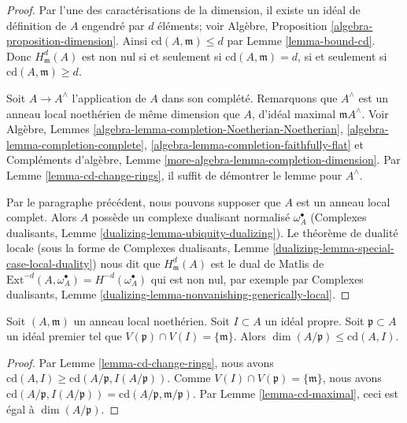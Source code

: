 \begin{proof}
Par l'une des caractérisations de la dimension, il existe
un idéal de définition de $A$ engendré par $d$ éléments; voir
Algèbre, Proposition \ref{algebra-proposition-dimension}.
Ainsi $\text{cd}(A, \mathfrak m) \leq d$ par
Lemme \ref{lemma-bound-cd}. Donc $H^d_\mathfrak m(A)$ est
non nul si et seulement si $\text{cd}(A, \mathfrak m) = d$, si et seulement si
$\text{cd}(A, \mathfrak m) \geq d$.

\medskip\noindent
Soit $A \to A^\wedge$ l'application de $A$ dans son complété.
Remarquons que $A^\wedge$ est un anneau local noethérien de
même dimension que $A$, d'idéal maximal $\mathfrak m A^\wedge$.
Voir Algèbre, Lemmes
\ref{algebra-lemma-completion-Noetherian-Noetherian},
\ref{algebra-lemma-completion-complete},
\ref{algebra-lemma-completion-faithfully-flat} et
Compléments d'algèbre, Lemme \ref{more-algebra-lemma-completion-dimension}.
Par Lemme \ref{lemma-cd-change-rings},
il suffit de démontrer le lemme pour $A^\wedge$.

\medskip\noindent
Par le paragraphe précédent, nous pouvons supposer que $A$ est
un anneau local complet. Alors $A$ possède un complexe dualisant normalisé
$\omega_A^\bullet$ (Complexes dualisants, Lemme
\ref{dualizing-lemma-ubiquity-dualizing}).
Le théorème de dualité locale (sous la forme de
Complexes dualisants, Lemme \ref{dualizing-lemma-special-case-local-duality})
nous dit que $H^d_\mathfrak m(A)$ est le dual de Matlis de
$\text{Ext}^{-d}(A, \omega_A^\bullet) = H^{-d}(\omega_A^\bullet)$
qui est non nul, par exemple par
Complexes dualisants, Lemme
\ref{dualizing-lemma-nonvanishing-generically-local}.
\end{proof}

\begin{lemma}
\label{lemma-cd-bound-dim-local}
Soit $(A, \mathfrak m)$ un anneau local noethérien.
Soit $I \subset A$ un idéal propre.
Soit $\mathfrak p \subset A$ un idéal premier
tel que $V(\mathfrak p) \cap V(I) = \{\mathfrak m\}$.
Alors $\dim(A/\mathfrak p) \leq \text{cd}(A, I)$.
\end{lemma}

\begin{proof}
Par Lemme \ref{lemma-cd-change-rings}, nous avons
$\text{cd}(A, I) \geq \text{cd}(A/\mathfrak p, I(A/\mathfrak p))$.
Comme $V(I) \cap V(\mathfrak p) = \{\mathfrak m\}$, nous avons
$\text{cd}(A/\mathfrak p, I(A/\mathfrak p)) =
\text{cd}(A/\mathfrak p, \mathfrak m/\mathfrak p)$.
Par Lemme \ref{lemma-cd-maximal}, ceci est égal à $\dim(A/\mathfrak p)$.
\end{proof}


